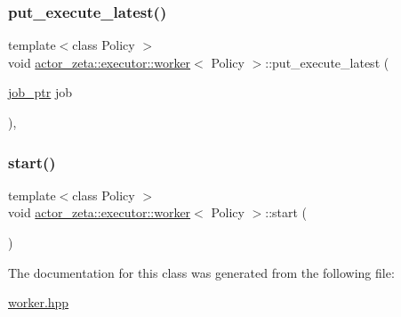 \mbox{\label{classactor__zeta_1_1executor_1_1worker_a64480cdfc253eddf75ff0798928163c6}} 
\subsubsection{\texorpdfstring{put\+\_\+execute\+\_\+latest()}{put\_execute\_latest()}}
{\footnotesize\ttfamily template$<$class Policy $>$ \\
void \hyperlink{classactor__zeta_1_1executor_1_1worker}{actor\+\_\+zeta\+::executor\+::worker}$<$ Policy $>$\+::put\+\_\+execute\+\_\+latest (\begin{DoxyParamCaption}\item[{\hyperlink{classactor__zeta_1_1executor_1_1worker_a74e3d9df71ad0b0df8d0c5403f8e642a}{job\+\_\+ptr}}]{job }\end{DoxyParamCaption})\hspace{0.3cm}{\ttfamily [inline]}, {\ttfamily [override]}}

\mbox{\label{classactor__zeta_1_1executor_1_1worker_a257ad22771ecbf3a9dbb1b2e86106893}} 
\subsubsection{\texorpdfstring{start()}{start()}}
{\footnotesize\ttfamily template$<$class Policy $>$ \\
void \hyperlink{classactor__zeta_1_1executor_1_1worker}{actor\+\_\+zeta\+::executor\+::worker}$<$ Policy $>$\+::start (\begin{DoxyParamCaption}{ }\end{DoxyParamCaption})\hspace{0.3cm}{\ttfamily [inline]}}



The documentation for this class was generated from the following file\+:\begin{DoxyCompactItemize}
\item 
\hyperlink{worker_8hpp}{worker.\+hpp}\end{DoxyCompactItemize}
